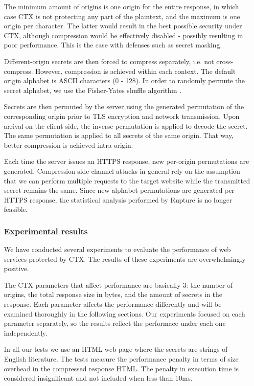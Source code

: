 \documentclass[conference, letterpaper, 10pt]{IEEEtran}
\begin{document}
The minimum amount of origins is one origin for the entire response, in which
case CTX is not protecting any part of the plaintext, and the maximum is one
origin per character. The latter would result in the best possible security
under CTX, although compression would be effectively disabled - possibly resulting
in poor performance. This is the case with defenses such as secret masking.

Different-origin secrets are then forced to compress separately, i.e. not
cross-compress. However, compression is achieved within each context. The
default origin alphabet is ASCII characters (0 - 128). In order to randomly
permute the secret alphabet, we use the Fisher-Yates shuffle
algorithm \cite{c11}.

Secrets are then permuted by the server using the generated permutation of the
corresponding origin prior to TLS encryption and network transmission. Upon
arrival on the client side, the inverse permutation is applied to decode the
secret. The same permutation is applied to all secrets of the same origin. That
way, better compression is achieved intra-origin.

Each time the server issues an HTTPS response, new per-origin permutations are
generated. Compression side-channel attacks in general rely on the assumption that we can
perform multiple requests to the target website while the transmitted secret
remains the same. Since new alphabet permutations are generated per HTTPS
response, the statistical analysis performed by Rupture is no longer feasible.

\subsubsection{Experimental results}\label{subsubsec:ctx_experiments}

We have conducted several experiments to evaluate the performance of web
services protected by CTX. The results of these experiments are overwhelmingly
positive.

The CTX parameters that affect performance are basically 3: the number of
origins, the total response size in bytes, and the amount of
secrets in the response. Each parameter affects the performance differently and
will be examined thoroughly in the following sections. Our experiments focused
on each parameter separately, so the results reflect the performace under each
one independently.

In all our tests we use an HTML web page where the secrets are strings of
English literature. The tests measure the performance penalty in terms of size
overhead in the compressed response HTML. The penalty in execution time is
considered insignificant and not included when less than 10ms.
\end{document}
